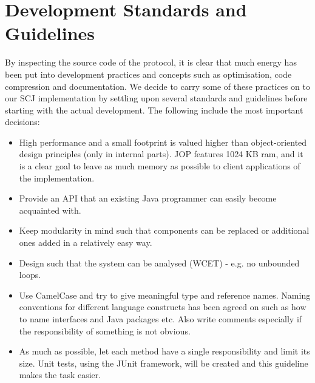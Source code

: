 \section{Development Standards and Guidelines}
By inspecting the source code of the protocol, it is clear that much energy has been put into development practices and concepts such as optimisation, code compression and documentation. We decide to carry some of these practices on to our SCJ implementation by settling upon several standards and guidelines before starting with the actual development. The following include the most important decisions:

\begin{itemize}
	\item High performance and a small footprint is valued higher than object-oriented design principles (only in internal parts). JOP features 1024 KB ram, and it is a clear goal to leave as much memory as possible to client applications of the implementation.
	\item Provide an API that an existing Java programmer can easily become acquainted with.
	\item Keep modularity in mind such that components can be replaced or additional ones added in a relatively easy way. 
	\item Design such that the system can be analysed (WCET) - e.g. no unbounded loops.
	\item Use CamelCase and try to give meaningful type and reference names. Naming conventions for different language constructs has been agreed on such as how to name interfaces and Java packages etc. Also write comments especially if the responsibility of something is not obvious.
	\item As much as possible, let each method have a single responsibility and limit its size. Unit tests, using the JUnit framework, will be created and this guideline makes the task easier.
\end{itemize}